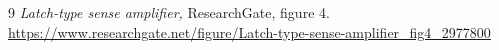 \documentclass[11pt,letterpaper]{article}
\begin{document}

\begin{thebibliography}{9}
  \emph{Latch-type sense amplifier,} ResearchGate, figure 4.\\
  \url{https://www.researchgate.net/figure/Latch-type-sense-amplifier_fig4_2977800}
\end{thebibliography}


\vspace{2em}

\noindent
{}
\end{document}
